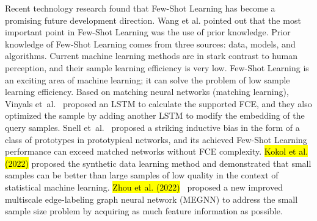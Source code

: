 \documentclass[mathematics,article,accept,pdftex,moreauthors]{Definitions/mdpi}
\begin{document}
Recent technology research found that Few-Shot Learning has become a promising future development direction. Wang et al. \cite{ref10} pointed out that the most important point in Few-Shot Learning was the use of prior knowledge. Prior knowledge of Few-Shot Learning comes from three sources: data, models, and algorithms. Current machine learning methods are in stark contrast to human perception, and their sample learning efficiency is very low. Few-Shot Learning is an exciting area of machine learning; it can solve the problem of low sample learning efficiency. Based on matching neural networks (matching learning), Vinyals \mbox{et al}.~\cite{ref11} proposed an LSTM to calculate the supported FCE, and they also optimized the sample by adding another LSTM to modify the embedding of the query samples. Snell \mbox{et al. \cite{ref12}} proposed a striking inductive bias in the form of a class of prototypes in prototypical networks, and its achieved Few-Shot Learning performance can exceed matched networks without FCE complexity. \hl{Kokol et al. (2022)} %
 \cite{ref13} proposed the synthetic data learning method and demonstrated that small samples can be better than large samples of low quality in the context of statistical machine learning. \hl{Zhou et al. (2022)}~\cite{ref14} proposed a new improved multiscale edge-labeling graph neural network (MEGNN) to address the small sample size problem by acquiring as much feature information as possible.
\end{document}
